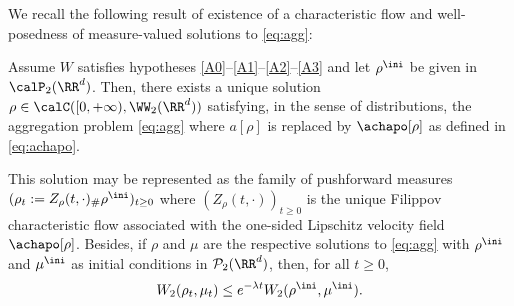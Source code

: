 We recall the following result of existence of a characteristic flow and well-posedness of measure-valued solutions to \eqref{eq:agg}:
\begin{theorem}\label{thm:cjlv15}
Assume $W$ satisfies hypotheses \eqref{A0}--\eqref{A1}--\eqref{A2}--\eqref{A3} and let $\rho^{\ini}$ be given in $\calP_2(\RR^d)$.
Then, there exists a unique solution $\rho \in \calC([0,+\infty), \WW _2(\RR^d))$
satisfying, in the sense of distributions, the aggregation problem \eqref{eq:agg} where $a[\rho]$ is replaced by $\achapo[\rho]$ as defined in \eqref{eq:achapo}.

This solution may be represented as the family of pushforward measures
$(\rho_t:=Z_{\rho}(t,\cdot){}_\# \rho^{\ini})_{t \geq 0}$
where $(Z_{\rho}(t,\cdot))_{t \geq 0}$ is the unique Filippov characteristic flow associated with the one-sided Lipschitz velocity
field $\achapo[\rho]$.
Besides, if $\rho$ and $\mu$
are the respective solutions to \eqref{eq:agg}
with $\rho^{\ini}$ and $\mu^{\ini}$ as initial conditions in ${\mathcal P}_{2}(\RR^d)$,
then, for all $t \geq 0$,
\begin{equation}\label{ineq:contractionLambdaCvx:cjlv5}
W_2(\rho_t,\mu_t) \leq e^{- \lambda t}
W_2(\rho^{\ini},\mu^{\ini}).
\end{equation}
\end{theorem}

